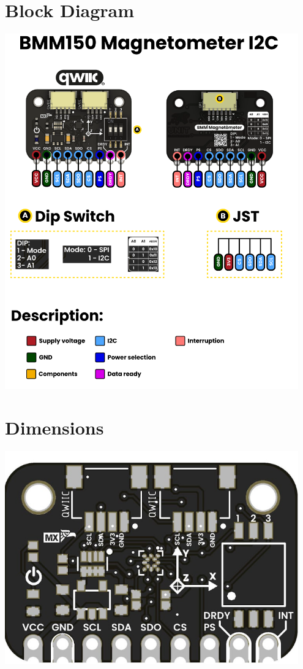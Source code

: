 \documentclass[10pt]{article}
\begin{document}
\section*{Block Diagram}
\vspace{1em}
\begin{center}
\includegraphics[width=0.95\textwidth,keepaspectratio]{images/function-diagram.png}
\end{center}
\newpage
\vspace*{3em}
\section*{Dimensions}
\vspace{1em}
\begin{center}
\includegraphics[width=0.95\textwidth,keepaspectratio]{images/dimensions.png}
\end{center}
\end{document}
